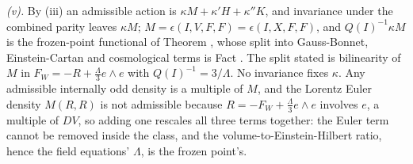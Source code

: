 \emph{(v).} By (iii) an admissible action is $\kappa M + \kappa' H + \kappa'' K$, and invariance under the combined parity leaves $\kappa M$; $M = \epsilon(I, V, F, F) = \epsilon(I, X, F, F)$, and $Q(I)^{-1}\kappa M$ is the frozen-point functional of Theorem , whose split into Gauss-Bonnet, Einstein-Cartan and cosmological terms is Fact . The split stated is bilinearity of $M$ in $F_{W} = -R + \tfrac{\Lambda}{3}e \wedge e$ with $Q(I)^{-1} = 3/\Lambda$. No invariance fixes $\kappa$. Any admissible internally odd density is a multiple of $M$, and the Lorentz Euler density $M(R, R)$ is not admissible because $R = -F_{W} + \tfrac{\Lambda}{3}e \wedge e$ involves $e$, a multiple of $DV$, so adding one rescales all three terms together: the Euler term cannot be removed inside the class, and the volume-to-Einstein-Hilbert ratio, hence the field equations' $\Lambda$, is the frozen point's.

